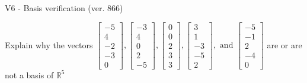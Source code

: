 \begin{exercise}
  \begin{exerciseTitle}V6 - Basis verification (ver. 866)\end{exerciseTitle}
  \begin{exerciseStatement}
    Explain why the vectors \(\left[\begin{array}{r}
-5 \\
4 \\
-2 \\
-3 \\
0
\end{array}\right] , \left[\begin{array}{r}
-3 \\
4 \\
0 \\
2 \\
-5
\end{array}\right] , \left[\begin{array}{r}
0 \\
0 \\
2 \\
3 \\
3
\end{array}\right] , \left[\begin{array}{r}
3 \\
1 \\
-3 \\
-5 \\
2
\end{array}\right] , \text{ and } \left[\begin{array}{r}
-5 \\
-1 \\
2 \\
-4 \\
0
\end{array}\right]\) are or are not a basis of \(\mathbb{R}^5\)	



\end{exerciseStatement}
\end{exercise}
